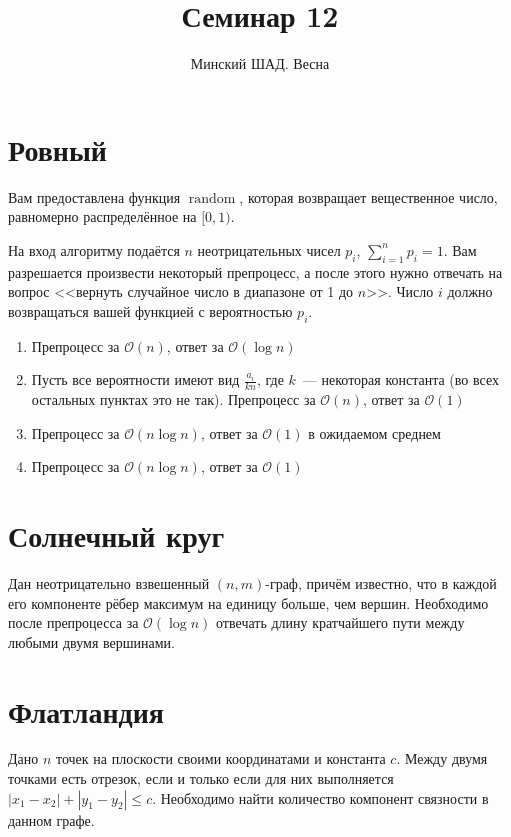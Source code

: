 \documentclass[addpoints]{exam}
\title{Семинар 12}
\author{Минский ШАД. Весна}
\DeclareMathOperator{\rnd}{random}
\begin{document}
\maketitle

\section{Ровный}

Вам предоставлена функция $\rnd$, которая возвращает вещественное число, равномерно распределённое на $[0,1)$.

На вход алгоритму подаётся $n$ неотрицательных чисел $p_i$, $\sum\limits_{i=1}^n p_i = 1$. Вам разрешается произвести некоторый препроцесс, а после этого нужно отвечать на вопрос <<вернуть случайное число в диапазоне от 1 до $n$>>. Число $i$ должно возвращаться вашей функцией с вероятностью $p_i$.

\begin{enumerate}
\item Препроцесс за $\mathcal{O}(n)$, ответ за $\mathcal{O}(\log{n})$
\item Пусть все вероятности имеют вид $\frac{a_i}{kn}$, где $k$~--- некоторая константа (во всех остальных пунктах это не так). Препроцесс за $\mathcal{O}(n)$, ответ за $\mathcal{O}(1)$
\item Препроцесс за $\mathcal{O}(n \log{n})$, ответ за $\mathcal{O}(1)$ в ожидаемом среднем
\item Препроцесс за $\mathcal{O}(n \log{n})$, ответ за $\mathcal{O}(1)$
\end{enumerate}

\section{Солнечный круг}

Дан неотрицательно взвешенный $(n,m)$-граф, причём известно, что в каждой его компоненте рёбер максимум на единицу больше, чем вершин. Необходимо после препроцесса за $\mathcal{O}(\log{n})$ отвечать длину кратчайшего пути между любыми двумя вершинами.

\section{Флатландия}

Дано $n$ точек на плоскости своими координатами и константа $c$. Между двумя точками есть отрезок, если и только если для них выполняется $|x_1 - x_2| + |y_1 - y_2| \leqslant c$. Необходимо найти количество компонент связности в данном графе.
\end{document}
